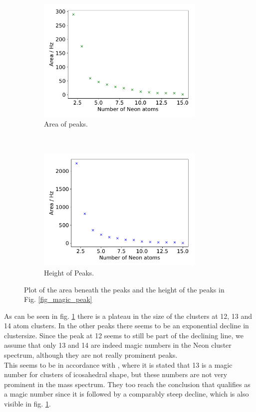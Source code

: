 \documentclass[a4paper,10pt]{article}
\begin{document}
\begin{figure}[H]
  \centering{}
  \begin{subfigure}[t]{0.45 \textwidth}
    \centering
    \includegraphics[height=6cm]{magic_area.pdf}
    \caption{Area of peaks.}
  \end{subfigure}
  ~
  \begin{subfigure}[t]{0.45 \textwidth}
    \centering
    \includegraphics[height=6cm]{magic_height.pdf}
    \caption{Height of Peaks. }
  \end{subfigure}
  \caption{Plot of the area beneath the peaks and the height of the peaks in Fig. \ref{fig_magic_peak}}
  \label{fig_magic_simple}
\end{figure}
As can be seen in fig. \ref{fig_magic_simple} there is a plateau in the size of the clusters at 12, 13 and 14 atom clusters. In the other peaks there seems to be an exponential decline in clustersize. Since the peak at 12 seems to still be part of the declining line, we assume that only 13 and 14 are indeed magic numbers in the Neon cluster spectrum, although they are not really prominent peaks. \\
This seems to be in accordance with \cite{paper_scheier}, where it is stated that 13 is a magic number for clusters of icosahedral shape, but these numbers are not very prominent in the mass spectrum. They too reach the conclusion that  qualifies as a magic number since it is followed by a comparably steep decline, which is also visible in fig. \ref{fig_magic_simple}.
\end{document}

